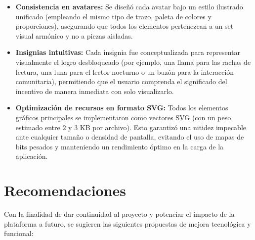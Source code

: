 \documentclass[12pt, atypical, journal]{article}
\begin{document}
\begin{itemize}
    \item \textbf{Consistencia en avatares:} Se diseñó cada avatar bajo un estilo ilustrado unificado (empleando el mismo tipo de trazo, paleta de colores y proporciones), asegurando que todos los elementos pertenezcan a un set visual armónico y no a piezas aisladas.
    \item \textbf{Insignias intuitivas:} Cada insignia fue conceptualizada para representar visualmente el logro desbloqueado (por ejemplo, una llama para las rachas de lectura, una luna para el lector nocturno o un buzón para la interacción comunitaria), permitiendo que el usuario comprenda el significado del incentivo de manera inmediata con solo visualizarlo.
    \item \textbf{Optimización de recursos en formato SVG:} Todos los elementos gráficos principales se implementaron como vectores SVG (con un peso estimado entre $2$ y $3$ KB por archivo). Esto garantizó una nitidez impecable ante cualquier tamaño o densidad de pantalla, evitando el uso de mapas de bits pesados y manteniendo un rendimiento óptimo en la carga de la aplicación.
    \end{itemize}

\newpage

\section{Recomendaciones}
Con la finalidad de dar continuidad al proyecto y potenciar el impacto de la plataforma a futuro, se sugieren las siguientes propuestas de mejora tecnológica y funcional:
\end{document}
